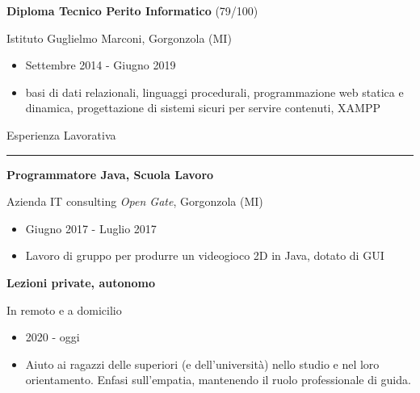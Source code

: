 \documentclass[a4paper]{letter}
\begin{document}
\begin{minipage}[t]{0.65\textwidth}
{\large \textbf{Diploma Tecnico Perito Informatico} \small (79/100)}

{\small Istituto Guglielmo Marconi, Gorgonzola (MI)}
\begin{itemize}
    \item Settembre 2014 - Giugno 2019
    \item basi di dati relazionali, linguaggi procedurali, programmazione web statica e dinamica, progettazione di sistemi sicuri per servire contenuti, XAMPP
\end{itemize}

\vspace{0.5cm}

{\large Esperienza Lavorativa}
\rule{\linewidth}{0.4pt}

{\large \textbf{Programmatore Java, Scuola Lavoro}}

{\small  Azienda IT consulting \textit{Open Gate}, Gorgonzola (MI)}

\begin{itemize}
    \item Giugno 2017 - Luglio 2017
    \item Lavoro di gruppo per produrre un videogioco 2D in Java, dotato di GUI
\end{itemize}

{\large \textbf{Lezioni private, autonomo}}

{\small In remoto e a domicilio}

\begin{itemize}
    \item 2020 - oggi
    \item Aiuto ai ragazzi delle superiori (e dell'università) nello studio e nel loro orientamento. Enfasi sull'empatia, mantenendo il ruolo professionale di guida.
\end{itemize}

\end{minipage}
\end{document}
